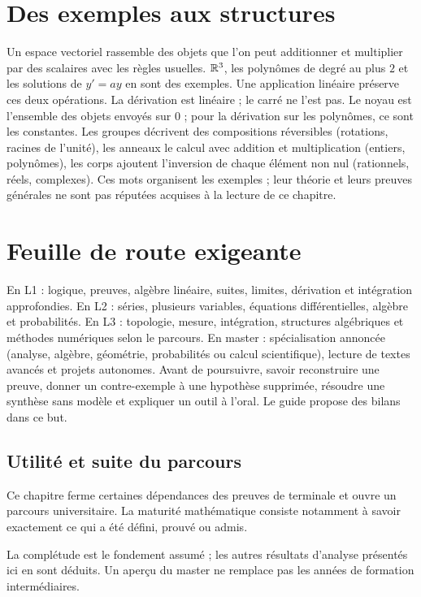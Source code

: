 \documentclass[../cours_tle.tex]{subfiles}
\begin{document}
\section{Des exemples aux structures}
Un espace vectoriel rassemble des objets que l'on peut additionner et multiplier par des scalaires avec les règles usuelles. $\mathbb{R}^3$, les polynômes de degré au plus $2$ et les solutions de $y'=ay$ en sont des exemples.
Une application linéaire préserve ces deux opérations. La dérivation est linéaire ; le carré ne l'est pas. Le noyau est l'ensemble des objets envoyés sur $0$ ; pour la dérivation sur les polynômes, ce sont les constantes.
Les groupes décrivent des compositions réversibles (rotations, racines de l'unité), les anneaux le calcul avec addition et multiplication (entiers, polynômes), les corps ajoutent l'inversion de chaque élément non nul (rationnels, réels, complexes).
Ces mots organisent les exemples ; leur théorie et leurs preuves générales ne sont pas réputées acquises à la lecture de ce chapitre.
\section{Feuille de route exigeante}
En L1 : logique, preuves, algèbre linéaire, suites, limites, dérivation et intégration approfondies.
En L2 : séries, plusieurs variables, équations différentielles, algèbre et probabilités.
En L3 : topologie, mesure, intégration, structures algébriques et méthodes numériques selon le parcours.
En master : spécialisation annoncée (analyse, algèbre, géométrie, probabilités ou calcul scientifique), lecture de textes avancés et projets autonomes.
Avant de poursuivre, savoir reconstruire une preuve, donner un contre-exemple à une hypothèse supprimée, résoudre une synthèse sans modèle et expliquer un outil à l'oral. Le guide propose des bilans dans ce but.
\begin{finchapitre}
\section{Utilité et suite du parcours}
Ce chapitre ferme certaines dépendances des preuves de terminale et ouvre un parcours universitaire. La maturité mathématique consiste notamment à savoir exactement ce qui a été défini, prouvé ou admis.
\begin{retenir}
La complétude est le fondement assumé ; les autres résultats d'analyse présentés ici en sont déduits. Un aperçu du master ne remplace pas les années de formation intermédiaires.
\end{retenir}
\end{finchapitre}
\end{document}
